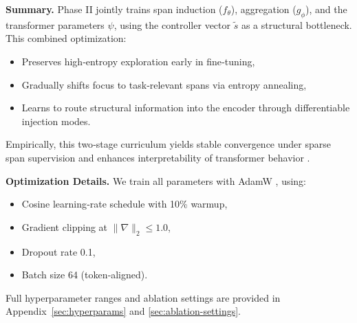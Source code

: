 \noindent\textbf{Summary.} Phase II jointly trains span induction (\(f_\theta\)), aggregation (\(g_\phi\)), and the transformer parameters \(\psi\), using the controller vector \(\tilde{s}\) as a structural bottleneck.  This combined optimization:
\begin{itemize}
	\item Preserves high‐entropy exploration early in fine‐tuning,  
	\item Gradually shifts focus to task‐relevant spans via entropy annealing,  
	\item Learns to route structural information into the encoder through differentiable injection modes.
\end{itemize}
Empirically, this two‐stage curriculum yields stable convergence under sparse span supervision and enhances interpretability of transformer behavior \cite{belinkov2022probing}.

\medskip
\noindent\textbf{Optimization Details.}  
We train all parameters with AdamW \cite{loshchilov2019decoupled}, using:
\begin{itemize}[leftmargin=1.5em]
	\item Cosine learning‐rate schedule with 10\% warmup,
	\item Gradient clipping at \(\|\nabla\|_2\le1.0\),
	\item Dropout rate 0.1,
	\item Batch size 64 (token‐aligned).
\end{itemize}
Full hyperparameter ranges and ablation settings are provided in Appendix~\ref{sec:hyperparams} and \ref{sec:ablation-settings}.